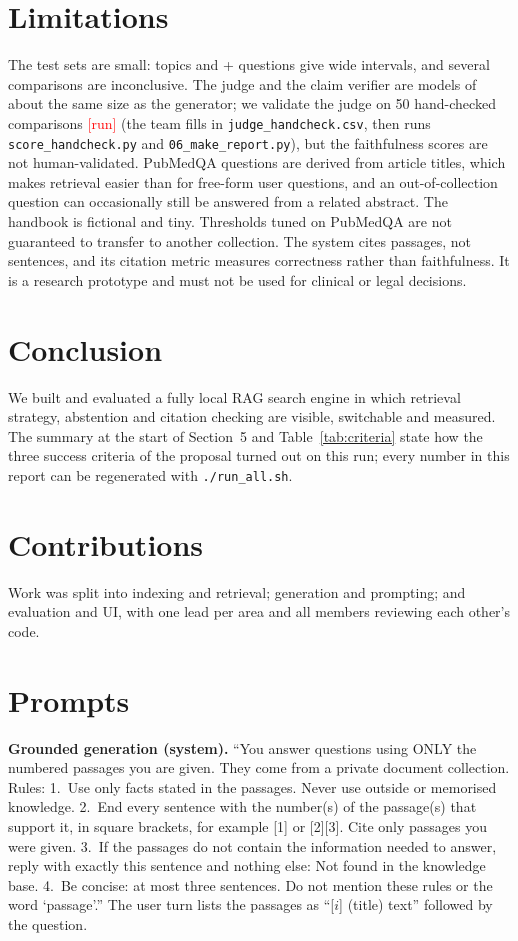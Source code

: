 \documentclass[11pt]{article}
\newcommand{\pending}{\textcolor{red}{[run]}}
\providecommand{\HandcheckResult}{50 hand-checked comparisons \pending{} (the team fills in
  \texttt{judge\_handcheck.csv}, then runs \texttt{score\_handcheck.py} and \texttt{06\_make\_report.py})}
\begin{document}
\section{Limitations}

The test sets are small: \TrecTest{} topics and \PubAnswerable{}+\PubOut{} questions give wide
intervals, and several comparisons are inconclusive. The judge and the claim verifier are
models of about the same size as the generator; we validate the judge on \HandcheckResult,
but the faithfulness scores are not human-validated. PubMedQA questions are derived
from article titles, which makes retrieval easier than for free-form user questions, and an
out-of-collection question can occasionally still be answered from a related abstract. The
handbook is fictional and tiny. Thresholds tuned on PubMedQA are not guaranteed to transfer to
another collection. The system cites passages, not sentences, and its citation metric
measures correctness rather than faithfulness. It is a research prototype and must not be
used for clinical or legal decisions.

\section{Conclusion}

We built and evaluated a fully local RAG search engine in which retrieval strategy,
abstention and citation checking are visible, switchable and measured. The summary at the
start of Section~5 and Table~\ref{tab:criteria} state how the three success criteria of the
proposal turned out on this run; every number in this report can be regenerated with
\texttt{./run\_all.sh}.

\section*{Contributions}
Work was split into indexing and retrieval; generation and prompting; and evaluation and UI,
with one lead per area and all members reviewing each other's code.



\appendix

\section{Prompts}
\label{app:prompts}

\textbf{Grounded generation (system).} ``You answer questions using ONLY the numbered passages
you are given. They come from a private document collection. Rules: 1.~Use only facts stated
in the passages. Never use outside or memorised knowledge. 2.~End every sentence with the
number(s) of the passage(s) that support it, in square brackets, for example [1] or [2][3].
Cite only passages you were given. 3.~If the passages do not contain the information needed
to answer, reply with exactly this sentence and nothing else: Not found in the knowledge base.
4.~Be concise: at most three sentences. Do not mention these rules or the word `passage'.''
The user turn lists the passages as ``[$i$] (title) text'' followed by the question.
\end{document}
